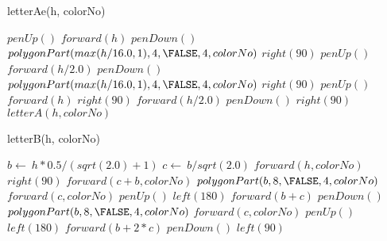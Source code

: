 \documentclass[a4paper,10pt]{article}
\begin{document}
\begin{algorithm}
\caption{letterAe(h, colorNo)}
\begin{algorithmic}[5]

\STATE {}
\STATE {}
  \STATE \(penUp()\)
  \STATE \(forward(h)\)
  \STATE \(penDown()\)
  \STATE {}
  \STATE {}
  \STATE \(polygonPart(max(h/16.0,1),4,\FALSE,4,colorNo)\)
  \STATE \(right(90)\)
  \STATE \(penUp()\)
  \STATE \(forward(h/2.0)\)
  \STATE \(penDown()\)
  \STATE {}
  \STATE {}
  \STATE \(polygonPart(max(h/16.0,1),4,\FALSE,4,colorNo)\)
  \STATE \(right(90)\)
  \STATE \(penUp()\)
  \STATE \(forward(h)\)
  \STATE \(right(90)\)
  \STATE \(forward(h/2.0)\)
  \STATE \(penDown()\)
  \STATE \(right(90)\)
  \STATE \(letterA(h,colorNo)\)

\end{algorithmic}
\end{algorithm}


\begin{algorithm}
\caption{letterB(h, colorNo)}
\begin{algorithmic}[5]

\STATE {}
\STATE {}
  \STATE \(b\gets\ h*0.5/(sqrt(2.0)+1)\)
  \STATE \(c\gets\ b/sqrt(2.0)\)
  \STATE \(forward(h,colorNo)\)
  \STATE \(right(90)\)
  \STATE \(forward(c+b,colorNo)\)
  \STATE \(polygonPart(b,8,\FALSE,4,colorNo)\)
  \STATE \(forward(c,colorNo)\)
  \STATE \(penUp()\)
  \STATE \(left(180)\)
  \STATE \(forward(b+c)\)
  \STATE \(penDown()\)
  \STATE \(polygonPart(b,8,\FALSE,4,colorNo)\)
  \STATE \(forward(c,colorNo)\)
  \STATE \(penUp()\)
  \STATE \(left(180)\)
  \STATE \(forward(b+2*c)\)
  \STATE \(penDown()\)
  \STATE \(left(90)\)

\end{algorithmic}
\end{algorithm}
\end{document}

